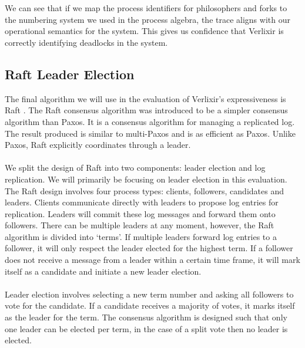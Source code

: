 \\ \\
We can see that if we map the process identifiers for philosophers and forks to the numbering system we used in the process algebra, the trace aligns with our operational semantics for the system. This gives us confidence that Verlixir is correctly identifying deadlocks in the system.

\subsection{Raft Leader Election} \label{sec:raft}
The final algorithm we will use in the evaluation of Verlixir's expressiveness is Raft \cite{raft}. The Raft consensus algorithm was introduced to be a simpler consensus algorithm than Paxos. It is a consensus algorithm for managing a replicated log. The result produced is similar to multi-Paxos and is as efficient as Paxos. Unlike Paxos, Raft explicitly coordinates through a leader.
\\ \\
We split the design of Raft into two components: leader election and log replication. We will primarily be focusing on leader election in this evaluation. The Raft design involves four process types: clients, followers, candidates and leaders. Clients communicate directly with leaders to propose log entries for replication. Leaders will commit these log messages and forward them onto followers. There can be multiple leaders at any moment, however, the Raft algorithm is divided into `terms'. If multiple leaders forward log entries to a follower, it will only respect the leader elected for the highest term. If a follower does not receive a message from a leader within a certain time frame, it will mark itself as a candidate and initiate a new leader election.
\\ \\
Leader election involves selecting a new term number and asking all followers to vote for the candidate. If a candidate receives a majority of votes, it marks itself as the leader for the term. The consensus algorithm is designed such that only one leader can be elected per term, in the case of a split vote then no leader is elected.
\\ \\
